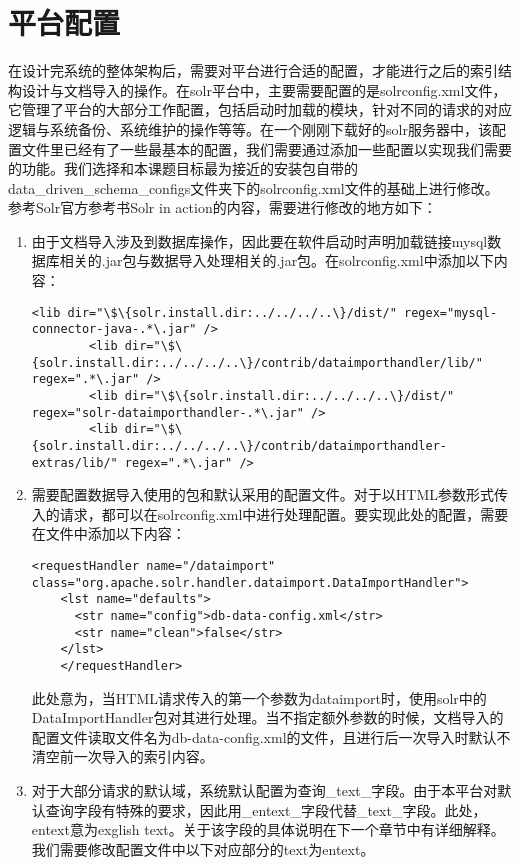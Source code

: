\section{平台配置}
    在设计完系统的整体架构后，需要对平台进行合适的配置，才能进行之后的索引结构设计与文档导入的操作。在solr平台中，主要需要配置的是solrconfig.xml文件，它管理了平台的大部分工作配置，包括启动时加载的模块，针对不同的请求的对应逻辑与系统备份、系统维护的操作等等。在一个刚刚下载好的solr服务器中，该配置文件里已经有了一些最基本的配置，我们需要通过添加一些配置以实现我们需要的功能。我们选择和本课题目标最为接近的安装包自带的data\_driven\_schema\_configs文件夹下的solrconfig.xml文件的基础上进行修改。参考Solr官方参考书Solr in action的内容，需要进行修改的地方如下：

    \begin{enumerate}
    \item 由于文档导入涉及到数据库操作，因此要在软件启动时声明加载链接mysql数据库相关的.jar包与数据导入处理相关的.jar包。在solrconfig.xml中添加以下内容：
    \begin{lstlisting}[caption={solrconfig.xml改动1}, label=ptszi1, escapeinside="", numbers=none]
        <lib dir="\$\{solr.install.dir:../../../..\}/dist/" regex="mysql-connector-java-.*\.jar" />
        <lib dir="\$\{solr.install.dir:../../../..\}/contrib/dataimporthandler/lib/" regex=".*\.jar" />
        <lib dir="\$\{solr.install.dir:../../../..\}/dist/" regex="solr-dataimporthandler-.*\.jar" />
        <lib dir="\$\{solr.install.dir:../../../..\}/contrib/dataimporthandler-extras/lib/" regex=".*\.jar" />
    \end{lstlisting}
    \item 需要配置数据导入使用的包和默认采用的配置文件。对于以HTML参数形式传入的请求，都可以在solrconfig.xml中进行处理配置。要实现此处的配置，需要在文件中添加以下内容：
    \begin{lstlisting}[caption={solrconfig.xml改动2}, label=ptszi2, escapeinside="", numbers=none]
    <requestHandler name="/dataimport" class="org.apache.solr.handler.dataimport.DataImportHandler">
    <lst name="defaults">
      <str name="config">db-data-config.xml</str>
      <str name="clean">false</str>
    </lst>
    </requestHandler>
    \end{lstlisting}
    此处意为，当HTML请求传入的第一个参数为dataimport时，使用solr中的DataImportHandler包对其进行处理。当不指定额外参数的时候，文档导入的配置文件读取文件名为db-data-config.xml的文件，且进行后一次导入时默认不清空前一次导入的索引内容。
    \item 对于大部分请求的默认域，系统默认配置为查询\_text\_字段。由于本平台对默认查询字段有特殊的要求，因此用\_entext\_字段代替\_text\_字段。此处，entext意为exglish text。关于该字段的具体说明在下一个章节中有详细解释。我们需要修改配置文件中以下对应部分的text为entext。

\end{enumerate}

